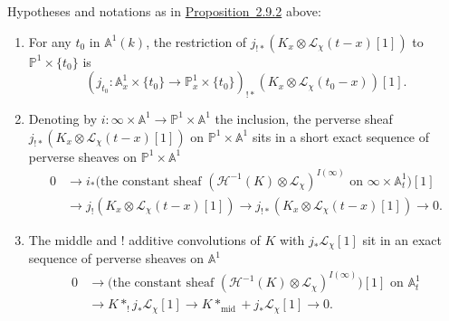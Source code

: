 Hypotheses and notations as in \hyperref[prop:2.9.2]{Proposition~2.9.2} above:
\begin{enumerate}[label=(\arabic*)]
\item For any \(t_0\) in \(\mathbb{A}^1(k)\), the restriction of
\(j_{!*}(K_x\otimes\mathcal{L}_\chi(t-x)[1])\) to
\(\mathbb{P}^1\times\{t_0\}\) is
\[
  (j_{t_0}:\mathbb{A}^1_x\times\{t_0\}\to
  \mathbb{P}^1_x\times\{t_0\})_{!*}
  (K_x\otimes\mathcal{L}_\chi(t_0-x))[1].
\]
\item Denoting by \(i:\infty\times\mathbb{A}^1\to
\mathbb{P}^1\times\mathbb{A}^1\) the inclusion, the perverse sheaf
\(j_{!*}(K_x\otimes\mathcal{L}_\chi(t-x)[1])\) on
\(\mathbb{P}^1\times\mathbb{A}^1\) sits in a short exact sequence of perverse
sheaves on \(\mathbb{P}^1\times\mathbb{A}^1\)
\[
  \begin{aligned}
    0 &\to
    i_*\bigl(\text{the constant sheaf }
    (\mathcal{H}^{-1}(K)\otimes\mathcal{L}_\chi)^{I(\infty)}
    \text{ on }\infty\times\mathbb{A}^1_t\bigr)[1]\\
    &\to j_!(K_x\otimes\mathcal{L}_\chi(t-x)[1])
    \to j_{!*}(K_x\otimes\mathcal{L}_\chi(t-x)[1])
    \to 0.
  \end{aligned}
\]
\item The middle and \(!\) additive convolutions of \(K\) with
\(j_*\mathcal{L}_\chi[1]\) sit in an exact sequence of perverse sheaves on
\(\mathbb{A}^1\)
\[
  \begin{aligned}
    0 &\to
    \bigl(\text{the constant sheaf }
    (\mathcal{H}^{-1}(K)\otimes\mathcal{L}_\chi)^{I(\infty)}\bigr)[1]
    \text{ on }\mathbb{A}^1_t\\
    &\to K*_!j_*\mathcal{L}_\chi[1]
    \to K*_{\mathrm{mid}}+j_*\mathcal{L}_\chi[1]
    \to 0.
  \end{aligned}
\]
\end{enumerate}

